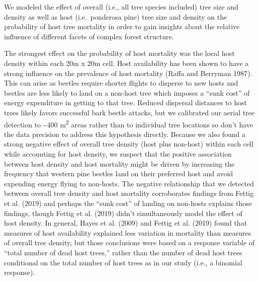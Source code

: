 \documentclass[]{article}
\begin{document}
We modeled the effect of overall (i.e., all tree species included) tree
size and density as well as host (i.e.~ponderosa pine) tree size and
density on the probability of host tree mortality in order to gain
insights about the relative influence of different facets of complex
forest structure.

The strongest effect on the probability of host mortality was the local
host density within each 20m x 20m cell. Host availability has been
shown to have a strong influence on the prevalence of host mortality
(Raffa and Berryman 1987). This can arise as beetles require shorter
flights to disperse to new hosts and beetles are less likely to land on
a non-host tree which imposes a ``sunk cost'' of energy expenditure in
getting to that tree. Reduced dispersal distances to host trees likely
favors successful bark beetle attacks, but we calibrated our aerial tree
detection to \textasciitilde{}400 m\textsuperscript{2} areas rather than
to individual tree locations so don't have the data precision to address
this hypothesis directly. Because we also found a strong negative effect
of overall tree density (host plus non-host) within each cell while
accounting for host density, we suspect that the positive association
between host density and host mortality might be driven by increasing
the frequency that western pine beetles land on their preferred host and
avoid expending energy flying to non-hosts. The negative relationship
that we detected between overall tree density and host mortality
corroborates findings from Fettig et al. (2019) and perhaps the ``sunk
cost'' of landing on non-hosts explains those findings, though Fettig et
al. (2019) didn't simultaneously model the effect of host density. In
general, Hayes et al. (2009) and Fettig et al. (2019) found that
measures of host availability explained less variation in mortality than
measures of overall tree density, but those conclusions were based on a
response variable of ``total number of dead host trees,'' rather than
the number of dead host trees conditional on the total number of host
trees as in our study (i.e., a binomial response).
\end{document}
